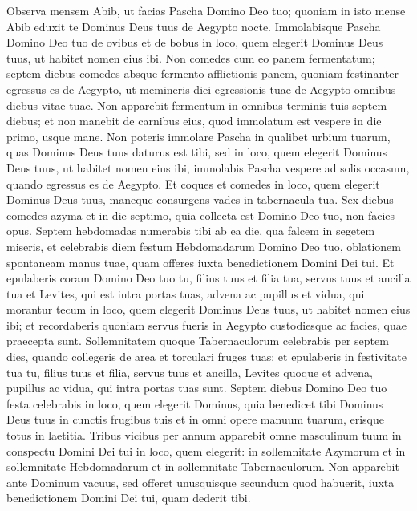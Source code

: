 \begin{biblechapter}
\begin{biblechapter}
\begin{biblechapter}
\begin{biblechapter}
\begin{biblechapter}
\begin{biblechapter}
\begin{biblechapter}
\begin{biblechapter}
\begin{biblechapter}
\begin{biblechapter}
\begin{biblechapter}
\begin{biblechapter}
\begin{biblechapter}
\begin{biblechapter}
\begin{biblechapter}
\begin{biblechapter}
\verse Observa mensem Abib, ut facias Pascha Domino Deo tuo; quoniam in isto mense Abib eduxit te Dominus Deus tuus de Aegypto nocte. 
\verse Immolabisque Pascha Domino Deo tuo de ovibus et de bobus in loco, quem elegerit Dominus Deus tuus, ut habitet nomen eius ibi. 
\verse Non comedes cum eo panem fermentatum; septem diebus comedes absque fermento afflictionis panem, quoniam festinanter egressus es de Aegypto, ut memineris diei egressionis tuae de Aegypto omnibus diebus vitae tuae. 
\verse Non apparebit fermentum in omnibus terminis tuis septem diebus; et non manebit de carnibus eius, quod immolatum est vespere in die primo, usque mane. 
\verse Non poteris immolare Pascha in qualibet urbium tuarum, quas Dominus Deus tuus daturus est tibi, 
\verse sed in loco, quem elegerit Dominus Deus tuus, ut habitet nomen eius ibi, immolabis Pascha vespere ad solis occasum, quando egressus es de Aegypto. 
\verse Et coques et comedes in loco, quem elegerit Dominus Deus tuus, maneque consurgens vades in tabernacula tua. 
\verse Sex diebus comedes azyma et in die septimo, quia collecta est Domino Deo tuo, non facies opus.
 \verse Septem hebdomadas numerabis tibi ab ea die, qua falcem in segetem miseris, 
 \verse et celebrabis diem festum Hebdomadarum Domino Deo tuo, oblationem spontaneam manus tuae, quam offeres iuxta benedictionem Domini Dei tui. 
\verse Et epulaberis coram Domino Deo tuo tu, filius tuus et filia tua, servus tuus et ancilla tua et Levites, qui est intra portas tuas, advena ac pupillus et vidua, qui morantur tecum in loco, quem elegerit Dominus Deus tuus, ut habitet nomen eius ibi; 
\verse et recordaberis quoniam servus fueris in Aegypto custodiesque ac facies, quae praecepta sunt.
 \verse Sollemnitatem quoque Tabernaculorum celebrabis per septem dies, quando collegeris de area et torculari fruges tuas; 
\verse et epulaberis in festivitate tua tu, filius tuus et filia, servus tuus et ancilla, Levites quoque et advena, pupillus ac vidua, qui intra portas tuas sunt. 
\verse Septem diebus Domino Deo tuo festa celebrabis in loco, quem elegerit Dominus, quia benedicet tibi Dominus Deus tuus in cunctis frugibus tuis et in omni opere manuum tuarum, erisque totus in laetitia.
 \verse Tribus vicibus per annum apparebit omne masculinum tuum in conspectu Domini Dei tui in loco, quem elegerit: in sollemnitate Azymorum et in sollemnitate Hebdomadarum et in sollemnitate Tabernaculorum. Non apparebit ante Dominum vacuus, 
\verse sed offeret unusquisque secundum quod habuerit, iuxta benedictionem Domini Dei tui, quam dederit tibi.

\end{biblechapter}
\end{biblechapter}
\end{biblechapter}
\end{biblechapter}
\end{biblechapter}
\end{biblechapter}
\end{biblechapter}
\end{biblechapter}
\end{biblechapter}
\end{biblechapter}
\end{biblechapter}
\end{biblechapter}
\end{biblechapter}
\end{biblechapter}
\end{biblechapter}
\end{biblechapter}
